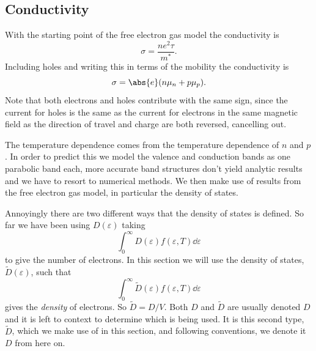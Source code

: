 \documentclass[fleqn]{NotesClass}
\begin{document}
    \subsection{Conductivity}
    With the starting point of the free electron gas model the conductivity is
    \begin{equation}
        \sigma = \frac{ne^2\tau}{m^*}.
    \end{equation}
    Including holes and writing this in terms of the mobility the conductivity is
    \begin{equation}
        \sigma = \abs{e} (n\mu_n + p\mu_p).
    \end{equation}
    Note that both electrons and holes contribute with the same sign, since the current for holes is the same as the current for electrons in the same magnetic field as the direction of travel and charge are both reversed, cancelling out.
    
    The temperature dependence comes from the temperature dependence of \(n\) and \(p\).
    In order to predict this we model the valence and conduction bands as one parabolic band each, more accurate band structures don't yield analytic results and we have to resort to numerical methods.
    We then make use of results from the free electron gas model, in particular the density of states.
    
    Annoyingly there are two different ways that the density of states is defined.
    So far we have been using \(D(\varepsilon)\) taking
    \begin{equation}
        \int_{0}^{\infty} D(\varepsilon)f(\varepsilon, T) \dd{\varepsilon}
    \end{equation}
    to give the number of electrons.
    In this section we will use the density of states, \(\tilde{D}(\varepsilon)\), such that
    \begin{equation}
        \int_{0}^{\infty} \tilde{D}(\varepsilon) f(\varepsilon, T) \dd{\varepsilon}
    \end{equation}
    gives the \emph{density} of electrons.
    So \(\tilde{D} = D/V\).
    Both \(D\) and \(\tilde{D}\) are usually denoted \(D\) and it is left to context to determine which is being used.
    It is this second type, \(\tilde{D}\), which we make use of in this section, and following conventions, we denote it \(D\) from here on.
    
\end{document}
